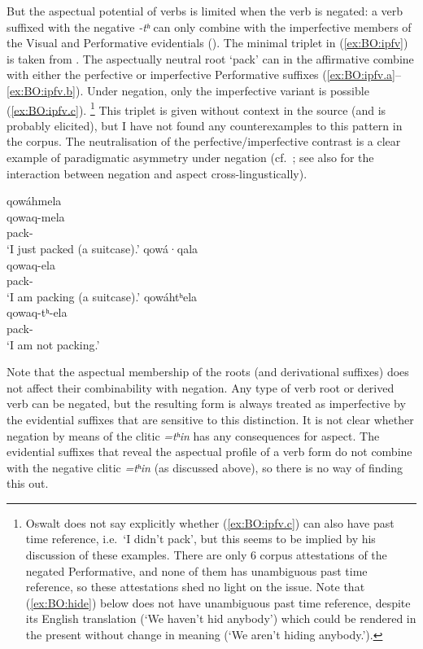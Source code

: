 \documentclass[output=paper,modfonts,nonflat,colorlinks,citecolor=brown]{langscibook}
\begin{document}
But the aspectual potential of verbs is limited when the verb is negated: a verb suffixed with the negative \textit{-tʰ} can only combine with the imperfective members of the Visual and Performative evidentials (\citealt[244--246]{Oswalt1961}). The minimal triplet in (\ref{ex:BO:ipfv}) is taken from \citet[45]{Oswalt1990}. The aspectually neutral root `pack' can in the affirmative combine with either the perfective or imperfective Performative suffixes (\ref{ex:BO:ipfv.a}--\ref{ex:BO:ipfv.b}). Under negation, only the imperfective variant is possible (\ref{ex:BO:ipfv.c}).%
\footnote{
Oswalt does not say explicitly whether (\ref{ex:BO:ipfv.c}) can also have past time reference, i.e.\ `I didn't pack', but this seems to be implied by his discussion of these examples. There are only 6 corpus attestations of the negated Performative, and none of them has unambiguous past time reference, so these attestations shed no light on the issue. Note that (\ref{ex:BO:hide}) below does not have unambiguous past time reference, despite its English translation (`We haven’t hid anybody') which could be rendered in the present without change in meaning (`We aren't hiding anybody.').
} %
This triplet is given without context in the source (and is probably elicited), but I have not found any counterexamples to this pattern in the corpus. The neutralisation of the perfective/imperfective contrast is a clear example of paradigmatic asymmetry under negation (cf.\ \citealt[54]{Miestamo2005}; see also \citealt{MiestamoAuwera2011} for the interaction between negation and aspect cross-lingustically).

\ea
\label{ex:BO:ipfv}
\begin{xlist}
\ex\label{ex:BO:ipfv.a}
\glll qowáhmela\\
     qowaq-mela\\
     pack-\\
\glt `I just packed (a suitcase).'
\ex\label{ex:BO:ipfv.b}
\glll qowá·qala\\
     qowaq-ela\\
     pack-\\
\glt `I am packing (a suitcase).'
\ex\label{ex:BO:ipfv.c}
\glll qowáhtʰela\\
     qowaq-tʰ-ela\\
     pack-\\
\glt `I am not packing.'
\end{xlist}
\z

Note that the aspectual membership of the roots (and derivational suffixes) does not affect their combinability with negation. Any type of verb root or derived verb can be negated, but the resulting form is always treated as imperfective by the evidential suffixes that are sensitive to this distinction. It is not clear whether negation by means of the clitic \textit{=tʰin} has any consequences for aspect. The evidential suffixes that reveal the aspectual profile of a verb form do not combine with the negative clitic \textit{=tʰin} (as discussed above), so there is no way of finding this out.
\end{document}
